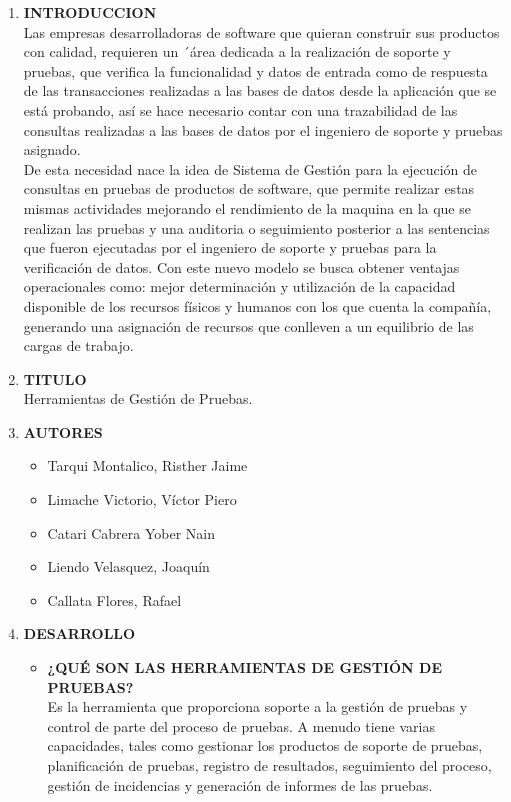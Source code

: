 \documentclass[12pt,a4paper,oneside]{book}
\begin{document}
	\begin{enumerate}
		\item \textbf{INTRODUCCION} \\
			Las empresas desarrolladoras de software que quieran construir sus productos con calidad, requieren un ´área dedicada a la realización de soporte y pruebas, que verifica la funcionalidad y datos de entrada como de respuesta de las transacciones realizadas a las bases de datos desde la aplicación que se está probando, así se hace necesario contar con una trazabilidad de las consultas realizadas a las bases de datos por el ingeniero de soporte y pruebas asignado. \\
			
			De esta necesidad nace la idea de Sistema de Gestión para la ejecución de consultas en pruebas de productos de software, que permite realizar estas mismas actividades mejorando el rendimiento de la maquina en la que se realizan las pruebas y una auditoria o seguimiento posterior a las sentencias que fueron ejecutadas por el ingeniero de soporte y pruebas para la verificación de datos. Con este nuevo modelo se busca obtener ventajas operacionales como: mejor determinación y utilización de la capacidad disponible de los recursos físicos y humanos con los que cuenta la compañía, generando una asignación de recursos que conlleven a un equilibrio de las cargas de trabajo.\\
			
		\item \textbf{TITULO} \\
			Herramientas de Gestión de Pruebas. \\
		\item \textbf{AUTORES}
			\begin{itemize}
				 \item Tarqui Montalico, Risther Jaime 
				 \item Limache Victorio, V\'ictor Piero 
				 \item Catari Cabrera Yober Nain 
				 \item Liendo Velasquez, Joaqu\'in 
				 \item Callata Flores, Rafael 
			\end{itemize}
		\item \textbf{DESARROLLO}
			\begin{itemize}
				\item \textbf{¿QUÉ SON LAS HERRAMIENTAS DE GESTIÓN DE PRUEBAS?}\\
					Es la herramienta que proporciona soporte a la gestión de pruebas y control de parte del proceso de pruebas. A menudo tiene varias capacidades, tales como gestionar los productos de soporte de pruebas, planificación de pruebas, registro de resultados, seguimiento del proceso, gestión de incidencias y generación de informes de las pruebas.\\
					

\end{itemize}
\end{enumerate}
\end{document}
